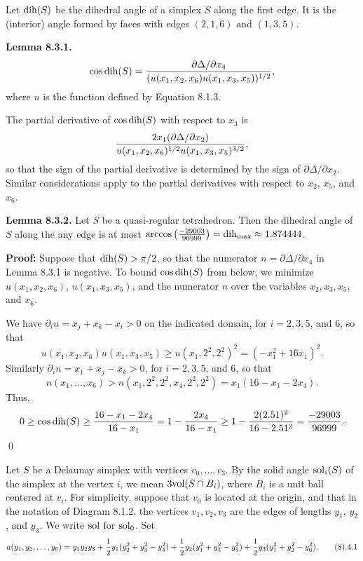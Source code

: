 
Let $\operatorname{dih}(S)$ be the dihedral
angle of a simplex $S$
along the first edge.
It is the (interior) angle formed by
faces with edges $(2,1,6)$ and $(1,3,5)$.


{\bf Lemma 8.3.1.}
$$\cos\operatorname{dih}(S) = {\partial\Delta/\partial x_4
\over
                (u(x_1,x_2,x_6)u(x_1,x_3,x_5))^{1/2} },$$
where $u$ is the function defined by Equation 8.1.3.

The partial derivative of $\cos\operatorname{dih}(S)$ with respect
to $x_3$ is
$${2x_1 (\partial\Delta/\partial x_2)\over u(x_1,x_2,x_6)^{1/2}
 u(x_1,x_3,x_5)^{3/2}},$$
so that the sign of the partial derivative is determined by the
sign of $\partial\Delta/\partial x_2$.  Similar considerations
apply to the partial derivatives with respect to $x_2$, $x_5$, and
$x_6$.

{\bf Lemma 8.3.2.}
Let $S$ be a quasi-regular tetrahedron.
Then the dihedral angle of $S$ along the any edge is
at most
$\arccos\left({-29003\over 96999}\right) = \operatorname{dih}_{\max}\approx 1.874444$.

{\bf Proof:}  Suppose that $\operatorname{dih}(S)>\pi/2$, so that the numerator $n=
\partial\Delta/\partial x_4$
in Lemma 8.3.1 is negative.  To bound $\cos\operatorname{dih}(S)$ from below, we minimize
$u(x_1,x_2,x_6)$, $u(x_1,x_3,x_5)$, and the numerator $n$ over the variables
$x_2,x_3,x_5$, and $x_6$.

We have $\partial_i u = x_j+x_k-x_i >0$ on the indicated domain,
for $i=2,3,5$, and $6$, so that
$$u(x_1,x_2,x_6) u(x_1,x_3,x_5)\ge u(x_1,2^2,2^2)^2 = (-x_1^2+16 x_1)^2.$$
Similarly $\partial_i n = x_1+x_j-x_k>0$, for $i=2,3,5$, and $6$, so that
$$n(x_1,\ldots,x_6) > n(x_1,2^2,2^2,x_4,2^2,2^2) = x_1(16-x_1-2x_4).$$
Thus,
$$0\ge\cos\operatorname{dih}(S)\ge {16-x_1-2x_4\over 16-x_1} = 1-{2x_4\over 16-x_1}
        \ge 1- {2(2.51)^2\over 16-2.51^2} = {-29003\over 96999}.
        $$\qed

\bigskip
{}
\bigskip

Let $S$ be a Delaunay simplex with vertices $v_0,\ldots,v_3$.
By the
solid angle
$\operatorname{sol}_i(S)$ of the simplex at the vertex $i$, we mean 
$3\hbox{vol}(S\cap B_i)$,
where ${B}_i$
is a unit ball centered at $v_i$.
For simplicity,
suppose that $v_0$ is located at the origin, and that in the notation of Diagram
8.1.2, the
vertices $v_1,v_2,v_3$ are the edges of lengths $y_1$, $y_2$, and $y_3$.
We write $\operatorname{sol}$ for $\operatorname{sol}_0$.
Set $$a(y_1,y_2,\ldots,y_6) = y_1y_2y_3 +
{1\over2}y_1(y_2^2+y_3^2-y_4^2) + {1\over2}y_2(y_1^2+y_3^2-y_5^2) +
{1\over2}y_3(y_1^2+y_2^2-y_6^2).
\tag 8.4.1$$

